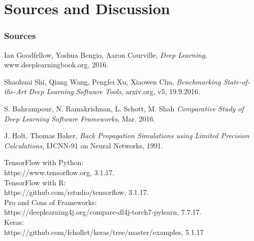 \documentclass[9pt]{beamer}
\begin{document}
\section{Sources and Discussion}

\begin{frame}
\frametitle{Sources}
\begin{thebibliography}{9}

  Ian Goodfellow,
  Yoshua Bengio,
  Aaron Courville,
  \emph{Deep Learning},
  www.deeplearningbook.org,
  2016.
  
  Shaohuai Shi,
  Qiang Wang,
  Pengfei Xu, 
  Xiaowen Chu,
  \emph{Benchmarking State-of-the-Art Deep Learning Software Tools},
  arxiv.org,
  v5,
  19.9.2016.
  	
	S. Bahrampour, 
	N. Ramakrishnan, 
	L. Schott, 
	M. Shah 
	\emph{Comparative Study of Deep Learning Software Frameworks},
	Mar. 2016.
	
	J. Holt,
	Thomas Baker,
	\emph{Back Propagation Simulations using Limited Precision Calculations},
	IJCNN-91 on Neural Networks, 
	1991.
  
	TensorFlow with Python:\\ https://www.tensorflow.org, 3.1.17.\\
  	TensorFlow with R:\\ https://github.com/rstudio/tensorflow, 3.1.17.\\
	Pro and Cons of Frameworks:\\ https://deeplearning4j.org/compare-dl4j-torch7-pylearn, 7.7.17.\\
	Keras:\\ https://github.com/fchollet/keras/tree/master/examples, 5.1.17\\
	
\end{thebibliography}
\end{frame}

\end{document}
